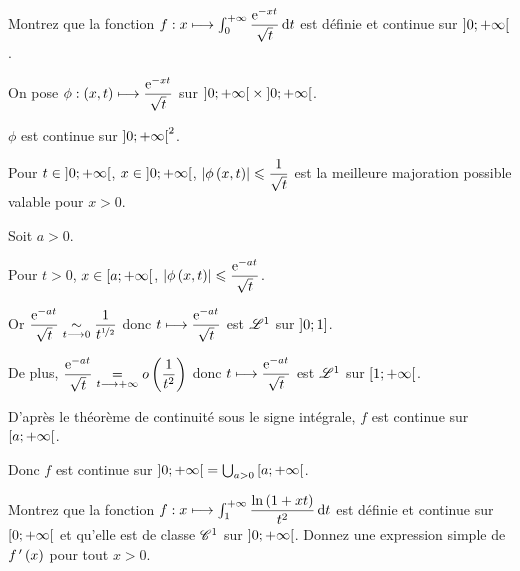 \begin{exo}
Montrez que la fonction \(f:x\mapsto\int_0^{\pinf}\dfrac{\e{-xt}}{\sqrt{t}}\odif{t}\) est définie et continue sur \(\left]0;+\infty\right[\).
\end{exo}

\begin{corr}
On pose \(\phi:\left(x,t\right)\longmapsto\dfrac{\mathrm{e}^{-xt}}{\sqrt{t}}\) sur \(\left]0;+\infty\right[\times\left]0;+\infty\right[\).

\(\phi\) est continue sur \(\left]0;+\infty\right[^2\).

Pour \(t\in\left]0;+\infty\right[\), \(x\in\left]0;+\infty\right[\), \(\left\lvert\phi\left(x,t\right)\right\rvert\leqslant\dfrac{1}{\sqrt{t}}\) est la meilleure majoration possible valable pour \(x>0\).

Soit \(a>0\).

Pour \(t>0\), \(x\in\left[a;+\infty\right[\), \(\left\lvert\phi\left(x,t\right)\right\rvert\leqslant\dfrac{\mathrm{e}^{-at}}{\sqrt{t}}\).

Or \(\dfrac{\mathrm{e}^{-at}}{\sqrt{t}}\underset{t\longrightarrow0}{\sim}\dfrac{1}{t^{\nicefrac{1}{2}}}\) donc \(t\longmapsto\dfrac{\mathrm{e}^{-at}}{\sqrt{t}}\) est \(\integ{1}{}{}\) sur \(\left]0;1\right]\).

De plus, \(\dfrac{\mathrm{e}^{-at}}{\sqrt{t}}\underset{t\longrightarrow+\infty}{=}o\left(\dfrac{1}{t^2}\right)\) donc \(t\longmapsto\dfrac{\mathrm{e}^{-at}}{\sqrt{t}}\) est \(\integ{1}{}{}\) sur \(\left[1;+\infty\right[\).

D'après le théorème de continuité sous le signe intégrale, \(f\) est continue sur \(\left[a;+\infty\right[\).

Donc \(f\) est continue sur \(\left]0;+\infty\right[=\bigcup_{a>0}\left[a;+\infty\right[\).
\end{corr}

\begin{exo}
Montrez que la fonction \(f:x\mapsto\int_1^{\pinf}\dfrac{\ln\paren{1+xt}}{t^2}\odif{t}\) est définie et continue sur \(\left[0;+\infty\right[\) et qu'elle est de classe \(\mathscr{C}^{1}\) sur \(\left]0;+\infty\right[\). Donnez une expression simple de \(f^{\,\prime}\left(x\right)\) pour tout \(x>0\).
\end{exo}

